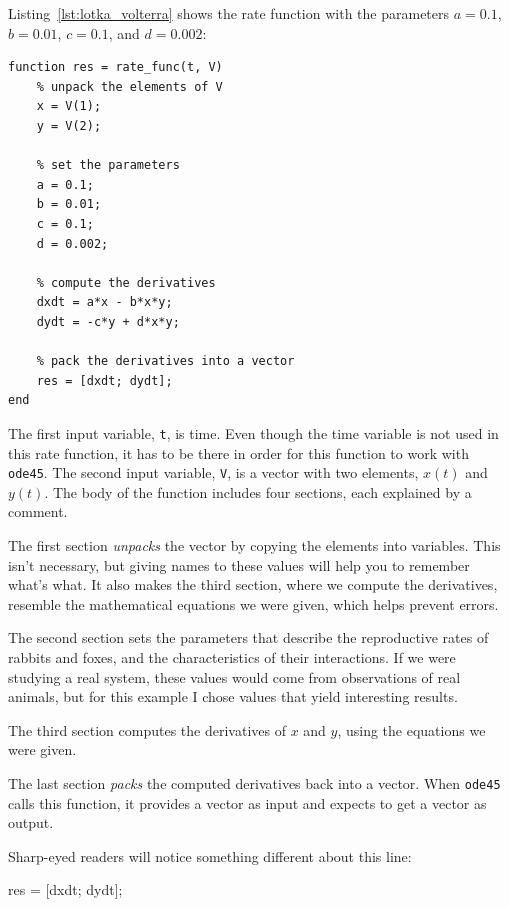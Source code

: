 Listing~\ref{lst:lotka_volterra} shows the rate function
with the parameters $a = 0.1$, $b = 0.01$, $c = 0.1$, and $d = 0.002$:

\begin{lstlisting}[caption={A rate function for Lotka-Volterra}, label={lst:lotka_volterra}]
function res = rate_func(t, V)
    % unpack the elements of V
    x = V(1);
    y = V(2);

    % set the parameters
    a = 0.1;
    b = 0.01;
    c = 0.1;
    d = 0.002;

    % compute the derivatives
    dxdt = a*x - b*x*y;
    dydt = -c*y + d*x*y;

    % pack the derivatives into a vector
    res = [dxdt; dydt];
end
\end{lstlisting}

The first input variable, \lstinline{t}, is time.
Even though the time variable is not used in this rate function,
it has to be there in order for this function to work with \lstinline{ode45}.
The second input variable, \lstinline{V}, is a vector with two elements,
$x(t)$ and $y(t)$.
The body of the function includes four sections, each explained by a comment.

The first section \emph{unpacks} the vector by copying the elements
into variables.  This isn't necessary, but giving names to
these values will help you to remember what's what.  It also makes the third
section, where we compute the derivatives, resemble the mathematical
equations we were given, which helps prevent errors.


The second section sets the parameters that describe the
reproductive rates of rabbits and foxes, and the characteristics of
their interactions.  If we were studying a real system, these values
would come from observations of real animals, but for this example
I chose values that yield interesting results.


The third section computes the derivatives of $x$ and $y$, using the equations
we were given.

The last section \emph{packs} the computed derivatives back into a
vector.  When \lstinline{ode45} calls this function, it provides a vector
as input and expects to get a vector as output.

Sharp-eyed readers will notice something different about this line:

\begin{code}
    res = [dxdt; dydt];
\end{code}

